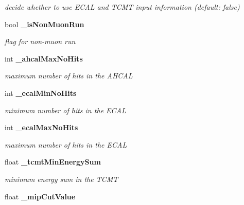 \begin{DoxyCompactItemize}
\begin{DoxyCompactList}\small\item\em decide whether to use ECAL and TCMT input information (default: false) \item\end{DoxyCompactList}\item 
bool {\bf \_\-isNonMuonRun}\label{classCALICE_1_1MipTrackFinder_a9e36ce713512208024f7e677f24d70fb}

\begin{DoxyCompactList}\small\item\em flag for non-\/muon run \item\end{DoxyCompactList}\item 
int {\bf \_\-ahcalMaxNoHits}\label{classCALICE_1_1MipTrackFinder_a91d061c42a10457d8e24b90cd298e634}

\begin{DoxyCompactList}\small\item\em maximum number of hits in the AHCAL \item\end{DoxyCompactList}\item 
int {\bf \_\-ecalMinNoHits}\label{classCALICE_1_1MipTrackFinder_aa7b08125cf046d630365de5f55cfbb6b}

\begin{DoxyCompactList}\small\item\em minimum number of hits in the ECAL \item\end{DoxyCompactList}\item 
int {\bf \_\-ecalMaxNoHits}\label{classCALICE_1_1MipTrackFinder_ad02eebf5cf6fef77436863f907374423}

\begin{DoxyCompactList}\small\item\em maximum number of hits in the ECAL \item\end{DoxyCompactList}\item 
float {\bf \_\-tcmtMinEnergySum}\label{classCALICE_1_1MipTrackFinder_af0a0a7decf81c16e7cfc8eab31e67a77}

\begin{DoxyCompactList}\small\item\em minimum energy sum in the TCMT \item\end{DoxyCompactList}\item 
float {\bf \_\-mipCutValue}\label{classCALICE_1_1MipTrackFinder_a64adc19b661b41b9867c5c56f247778d}


\end{DoxyCompactItemize}
